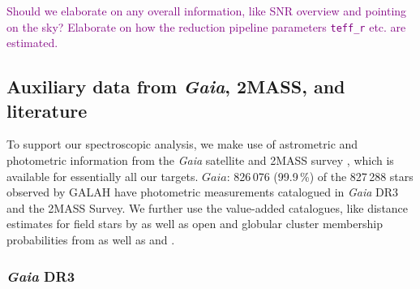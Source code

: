 \documentclass[
  journal=pasa,
  manuscript=research-paper, %
  year=2023,
  volume=37
]{cup-journal}
\newcommand{\SB}[1]{{\textcolor{purple}{#1}}}
\newcommand{\Gaia}{\textit{Gaia}\xspace}
\begin{document}
\SB{Should we elaborate on any overall information, like SNR overview and pointing on the sky?}
\SB{Elaborate on how the reduction pipeline parameters \texttt{teff\_r} etc. are estimated.}

\subsection{Auxiliary data from \Gaia, 2MASS, and literature} \label{sec:non-spec_data}


To support our spectroscopic analysis, we make use of astrometric and photometric information from the \Gaia satellite \citep{Gaia-Collaboration2016} and 2MASS survey \citep{Skrutskie2006}, which is available for essentially all our targets. $Gaia$: 826\,076 (99.9\,\%) of the 827\,288 stars observed by GALAH have photometric measurements catalogued in \Gaia DR3 and the 2MASS Survey. We further use the value-added catalogues, like distance estimates for field stars by \citep{BailerJones2021} as well as open and globular cluster membership probabilities from \citet{CantatGaudin2020} as well as \citet{Vasiliev2021} and \citet{Baumgardt2021}.

\subsubsection{\Gaia DR3}
\end{document}

